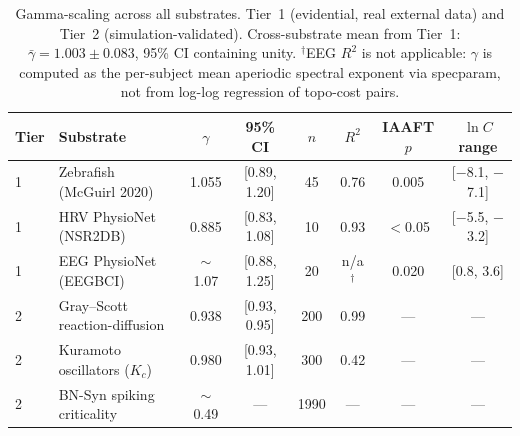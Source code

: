 \documentclass[11pt,a4paper,twocolumn]{article}
\begin{document}
\begin{table}[!tp]
\centering
\caption{Gamma-scaling across all substrates. Tier~1 (evidential, real external data) and Tier~2 (simulation-validated). Cross-substrate mean from Tier~1: $\bar{\gamma} = 1.003 \pm 0.083$, 95\% CI containing unity. $^\dagger$EEG $R^2$ is not applicable: $\gamma$ is computed as the per-subject mean aperiodic spectral exponent via specparam, not from log-log regression of topo-cost pairs.}
\label{tab:all_substrates}
\small
\begin{tabular}{@{}l l c c c c c c@{}}
\toprule
\textbf{Tier} & \textbf{Substrate} & $\gamma$ & \textbf{95\% CI} & $n$ & $R^2$ & \textbf{IAAFT} $p$ & $\ln C$ range \\
\midrule
1 & Zebrafish (McGuirl 2020) & 1.055 & [0.89, 1.20] & 45 & 0.76 & 0.005 & [$-$8.1, $-$7.1] \\
1 & HRV PhysioNet (NSR2DB) & 0.885 & [0.83, 1.08] & 10 & 0.93 & $<$0.05 & [$-$5.5, $-$3.2] \\
1 & EEG PhysioNet (EEGBCI) & ${\sim}$1.07 & [0.88, 1.25] & 20 & n/a$^\dagger$ & 0.020 & [0.8, 3.6] \\
\midrule
2 & Gray--Scott reaction-diffusion & 0.938 & [0.93, 0.95] & 200 & 0.99 & --- & --- \\
2 & Kuramoto oscillators ($K_c$) & 0.980 & [0.93, 1.01] & 300 & 0.42 & --- & --- \\
2 & BN-Syn spiking criticality & ${\sim}$0.49 & --- & 1990 & --- & --- & --- \\
\bottomrule
\end{tabular}
\end{table}
\end{document}
